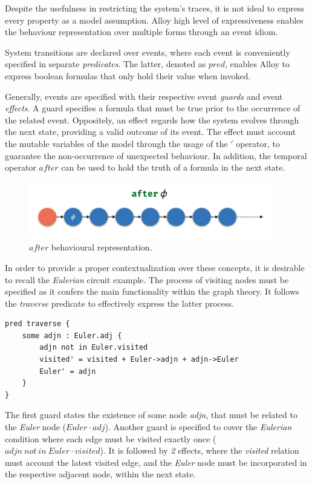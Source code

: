Despite the usefulness in restricting the system's traces, it is not ideal to express every property as a model assumption. Alloy high level of expressiveness enables the behaviour representation over multiple forms through an event idiom. \cite{lwspecification}

System transitions are declared over events, where each event is conveniently specified in separate \textit{predicates}. The latter, denoted as $pred$, enables Alloy to express boolean formulas that only hold their value when invoked. 

Generally, events are specified with their respective event \textit{guards} and event \textit{effects}. A guard specifies a formula that must be true prior to the occurrence of the related event. Oppositely, an effect regards how the system evolves through the next state, providing a valid outcome of its event. The effect must account the mutable variables of the model through the usage of the $'$ operator, to guarantee the non-occurrence of unexpected behaviour. In addition, the temporal operator $after$ can be used to hold the truth of a formula in the next state.

\begin{figure}[H]
    \centering
    \includegraphics[width=0.6\linewidth]{images/alloy_after.png}
    \caption{$after$ behavioural representation.}
    \label{fig:alloy-after}
\end{figure}

In order to provide a proper contextualization over these concepts, it is desirable to recall the \textit{Eulerian} circuit example. The process of visiting nodes must be specified as it confers the main functionality within the graph theory. It follows the \textit{traverse} predicate to effectively express the latter process. 

\begin{lstlisting}[title={\textit{Eulerian} visiting event.}, otherkeywords = {pred, some, \:, \., not, in, ', \=, \+, \-\>}, floatplacement=H]
pred traverse {
    some adjn : Euler.adj {
        adjn not in Euler.visited
        visited' = visited + Euler->adjn + adjn->Euler
        Euler' = adjn
    }
}
\end{lstlisting}

The first guard states the existence of some node \textit{adjn}, that must be related to the \textit{Euler} node ($Euler \cdot adj$). Another guard is specified to cover the \textit{Eulerian} condition where each edge must be visited exactly once ($adjn\ not\ in\ Euler \cdot visited$). It is followed by \textit{2} effects, where the \textit{visited} relation must account the latest visited edge, and the \textit{Euler} node must be incorporated in the respective adjacent node, within the next state.

